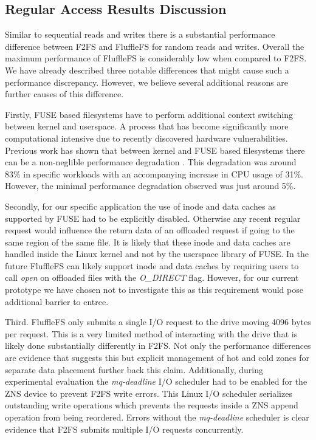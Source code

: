 \subsection{Regular Access Results Discussion}

Similar to sequential reads and writes there is a substantial performance
difference between F2FS and FluffleFS for random reads and writes. Overall the
maximum performance of FluffleFS is considerably low when compared to F2FS. We
have already described three notable differences that might cause such a
performance discrepancy. However, we believe several additional reasons are
further causes of this difference.

Firstly, FUSE based filesystems have to perform additional context switching
between kernel and userspace. A process that has become significantly more
computational intensive due to recently discovered hardware vulnerabilities.
Previous work has shown that between kernel and FUSE based filesystems there can
be a non-neglible performance degradation \cite{Vangoor2017ToFO}. This
degradation was around 83\% in specific workloads with an accompanying increase
in CPU usage of 31\%. However, the minimal performance degradation observed was
just around 5\%.

Secondly, for our specific application the use of inode and data caches as
supported by FUSE had to be explicitly disabled. Otherwise any recent regular
request would influence the return data of an offloaded request if going to the
same region of the same file. It is likely that these inode and data caches are
handled inside the Linux kernel and not by the userspace library of FUSE. 
In the future FluffleFS can likely support inode and data caches by requiring
users to call \textit{open} on offloaded files with the \textit{O\_DIRECT}
flag. However, for our current prototype we have chosen not to investigate this
as this requirement would pose additional barrier to entree.

Third. FluffleFS only submits a single I/O request to the drive moving 4096
bytes per request. This is a very limited method of interacting with the drive
that is likely done substantially differently in F2FS. Not only the performance
differences are evidence that suggests this but explicit management of hot
and cold zones for separate data placement further back this claim.
Additionally, during experimental evaluation the \textit{mq-deadline} I/O
scheduler had to be enabled for the ZNS device to prevent F2FS write errors.
This Linux I/O scheduler serializes outstanding write operations which prevents
the requests inside a ZNS append operation from being reordered. Errors
without the \textit{mq-deadline} scheduler is clear evidence that F2FS submits
multiple I/O requests concurrently.

